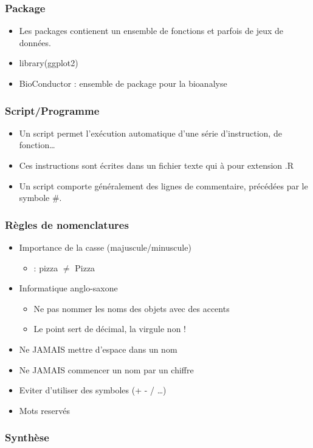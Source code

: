 \documentclass[table,svgnames,hyperref={pdfpagemode=FullScreen}]{beamer}
\newcommand{\grille}{
\begin{tikzpicture}[overlay,remember picture]
	\begin{scope}[shift={(current page.south west)}]
		\draw[gray!50] (0,0) grid[step=2mm] (current page.north east);
		\draw[red!50] (0,0) grid[step=1cm] (current page.north east);
		\draw (0.2,1) node {1};
     \draw (0.2,2) node {2};
     \draw (0.2,3) node {3};
     \draw (0.2,4) node {4};
     \draw (0.2,5) node {5};
     \draw (0.2,6) node {6};
     \draw (0.2,7) node {7};
     \draw (0.2,8) node {8};
     \draw (0.2,9) node {9};
     \draw (1,0.5) node {1};
     \draw (2,0.5) node {2};
     \draw (3,0.5) node {3};
     \draw (4,0.5) node {4};
     \draw (5,0.5) node {5};
     \draw (6,0.5) node {6};
     \draw (7,0.5) node {7};
     \draw (8,0.5) node {8};
     \draw (9,0.5) node {9};
     \draw (10,0.5) node {10};
     \draw (11,0.5) node {11};
     \draw (12,0.5) node {12};
\end{scope}
\end{tikzpicture}
}
\begin{document}
	\begin{frame}
		\frametitle{Package}
		\begin{itemize}
			\item Les packages contienent un ensemble de fonctions et parfois de jeux de données.
			\item	library(ggplot2)
			\item BioConductor : ensemble de package pour la bioanalyse
		\end{itemize}
	\end{frame}
	\begin{frame}
		\setbeamercovered{dynamic}
		\frametitle{Script/Programme}
		\begin{itemize}
			\item Un script permet l'exécution automatique d'une série d'instruction, de fonction\dots
			\item Ces instructions sont écrites dans un fichier texte qui à pour extension .R
			\item Un script comporte généralement des lignes de commentaire, précédées par le symbole \#.
		\end{itemize}

		
	\end{frame}
\begin{frame}
	\frametitle{Règles de nomenclatures}
	\begin{itemize}
		\item Importance de la casse (majuscule/minuscule)
			\begin{itemize}
				\item : pizza  $\neq$ Pizza
			\end{itemize}
		\item Informatique anglo-saxone
			\begin{itemize}
				\item Ne pas nommer les noms des objets avec des accents 
				\item Le point sert de décimal, la virgule non !
			\end{itemize}
		\item Ne JAMAIS mettre d'espace dans un nom  
		\item Ne JAMAIS commencer un nom par un chiffre 
		\item Eviter d'utiliser des symboles (+ - / \dots)
		\item Mots reservés
	\end{itemize}
\end{frame}
\begin{frame}
	\frametitle{Synthèse}
	\begin{center}
	
\end{center}
\end{frame}
\end{document}
